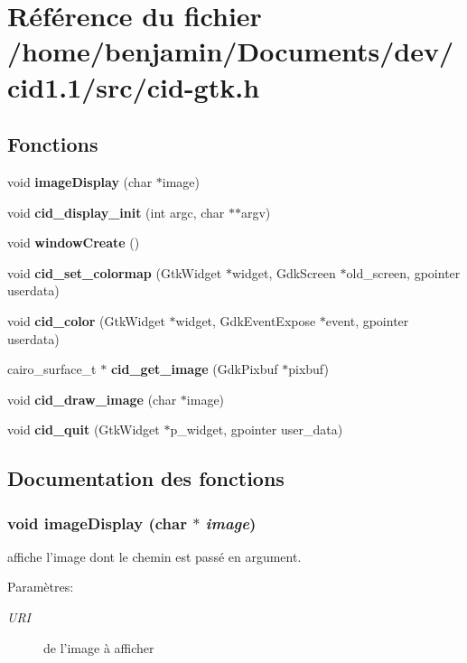 \section{Référence du fichier /home/benjamin/Documents/dev/cid1.1/src/cid-gtk.h}
\label{cid-gtk_8h}
\subsection*{Fonctions}
\begin{CompactItemize}
\item 
void {\bf imageDisplay} (char $\ast$image)
\item 
void {\bf cid\_\-display\_\-init} (int argc, char $\ast$$\ast$argv)
\item 
void {\bf windowCreate} ()
\item 
void {\bf cid\_\-set\_\-colormap} (GtkWidget $\ast$widget, GdkScreen $\ast$old\_\-screen, gpointer userdata)
\item 
void {\bf cid\_\-color} (GtkWidget $\ast$widget, GdkEventExpose $\ast$event, gpointer userdata)
\item 
cairo\_\-surface\_\-t $\ast$ {\bf cid\_\-get\_\-image} (GdkPixbuf $\ast$pixbuf)
\item 
void {\bf cid\_\-draw\_\-image} (char $\ast$image)
\item 
void {\bf cid\_\-quit} (GtkWidget $\ast$p\_\-widget, gpointer user\_\-data)
\end{CompactItemize}


\subsection{Documentation des fonctions}
\subsubsection{\setlength{\rightskip}{0pt plus 5cm}void imageDisplay (char $\ast$ {\em image})}\label{cid-gtk_8h_9c5f429709e642f6d10349260ca659f4}


affiche l'image dont le chemin est passé en argument. \begin{Desc}
\item[Paramètres:]
\begin{description}
\item[{\em URI}]de l'image à afficher \end{description}
\end{Desc}


